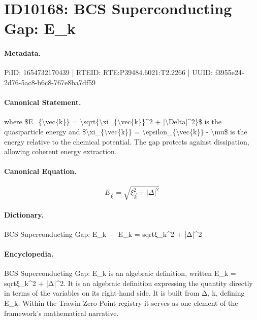 \section*{ID10168: BCS Superconducting Gap: E\_k}
\paragraph{Metadata.}
PiID: 1654732170439 | RTEID: RTE:P39484.6021:T2.2266 | UUID: f3955e24-2d76-5ac8-b6c8-767e8ba7df59

\paragraph{Canonical Statement.}
where \$E\_\{\textbackslash{}vec\{k\}\} = \textbackslash{}sqrt\{\textbackslash{}xi\_\{\textbackslash{}vec\{k\}\}\textasciicircum{}2 + |\textbackslash{}Delta|\textasciicircum{}2\}\$ is the quasiparticle energy and \$\textbackslash{}xi\_\{\textbackslash{}vec\{k\}\} = \textbackslash{}epsilon\_\{\textbackslash{}vec\{k\}\} - \textbackslash{}mu\$ is the energy relative to the chemical potential. The gap protects against dissipation, allowing coherent energy extraction.

\paragraph{Canonical Equation.}
\[
E_{\vec{k}} = \sqrt{\xi_{\vec{k}}^2 + |\Delta|^2}
\]

\paragraph{Dictionary.}
BCS Superconducting Gap: E\_k — E\_k = sqrtξ\_k\textasciicircum{}2 + |Δ|\textasciicircum{}2

\paragraph{Encyclopedia.}
BCS Superconducting Gap: E\_k is an algebraic definition, written E\_k = sqrtξ\_k\textasciicircum{}2 + |Δ|\textasciicircum{}2. It is an algebraic definition expressing the quantity directly in terms of the variables on its right-hand side. It is built from Δ, k, defining E\_k. Within the Trawin Zero Point registry it serves as one element of the framework's mathematical narrative.
